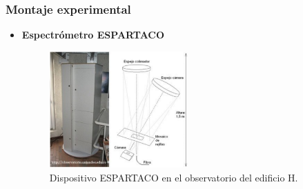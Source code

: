 \documentclass{beamer}
\begin{document}

%
%
%





\begin{frame}
\frametitle{Montaje experimental}
\begin{itemize}
	\item\textbf{Espectrómetro ESPARTACO} 
	\begin{figure}[h!]
		\centering
		\includegraphics[width=0.5\textwidth]{espectrometro}
		\caption{Dispositivo ESPARTACO en el observatorio del edificio H.}
	\end{figure}
\end{itemize}

\end{frame}
\end{document}
